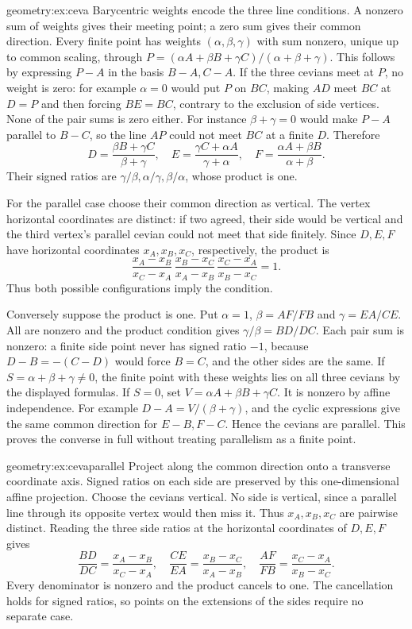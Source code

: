\begin{solution}{geometry:ex:ceva}
\idea Barycentric weights encode the three line conditions. A nonzero sum of weights gives their meeting point; a zero sum gives their common direction.
\writeup Every finite point has weights $(\alpha,\beta,\gamma)$ with sum nonzero, unique up to common scaling, through
$P=(\alpha A+\beta B+\gamma C)/(\alpha+\beta+\gamma)$. This follows by expressing $P-A$ in the basis $B-A,C-A$. If the three cevians meet at $P$, no weight is zero: for example $\alpha=0$ would put $P$ on $BC$, making $AD$ meet $BC$ at $D=P$ and then forcing $BE=BC$, contrary to the exclusion of side vertices. None of the pair sums is zero either. For instance $\beta+\gamma=0$ would make $P-A$ parallel to $B-C$, so the line $AP$ could not meet $BC$ at a finite $D$. Therefore
\[
D=\frac{\beta B+\gamma C}{\beta+\gamma},\quad
E=\frac{\gamma C+\alpha A}{\gamma+\alpha},\quad
F=\frac{\alpha A+\beta B}{\alpha+\beta}.
\]
Their signed ratios are $\gamma/\beta,\alpha/\gamma,\beta/\alpha$, whose product is one.

For the parallel case choose their common direction as vertical. The vertex horizontal coordinates are distinct: if two agreed, their side would be vertical and the third vertex's parallel cevian could not meet that side finitely. Since $D,E,F$ have horizontal coordinates $x_A,x_B,x_C$, respectively, the product is
\[
\frac{x_A-x_B}{x_C-x_A}\,
\frac{x_B-x_C}{x_A-x_B}\,
\frac{x_C-x_A}{x_B-x_C}=1.
\]
Thus both possible configurations imply the condition.

Conversely suppose the product is one. Put $\alpha=1$, $\beta=AF/FB$ and $\gamma=EA/CE$. All are nonzero and the product condition gives $\gamma/\beta=BD/DC$. Each pair sum is nonzero: a finite side point never has signed ratio $-1$, because $D-B=-(C-D)$ would force $B=C$, and the other sides are the same. If $S=\alpha+\beta+\gamma\ne0$, the finite point with these weights lies on all three cevians by the displayed formulas. If $S=0$, set $V=\alpha A+\beta B+\gamma C$. It is nonzero by affine independence. For example
$D-A=V/(\beta+\gamma)$, and the cyclic expressions give the same common direction for $E-B,F-C$. Hence the cevians are parallel. This proves the converse in full without treating parallelism as a finite point.
\end{solution}

\begin{solution}{geometry:ex:cevaparallel}
\idea Project along the common direction onto a transverse coordinate axis. Signed ratios on each side are preserved by this one-dimensional affine projection.
\writeup Choose the cevians vertical. No side is vertical, since a parallel line through its opposite vertex would then miss it. Thus $x_A,x_B,x_C$ are pairwise distinct. Reading the three side ratios at the horizontal coordinates of $D,E,F$ gives
\[
\frac{BD}{DC}=\frac{x_A-x_B}{x_C-x_A},\quad
\frac{CE}{EA}=\frac{x_B-x_C}{x_A-x_B},\quad
\frac{AF}{FB}=\frac{x_C-x_A}{x_B-x_C}.
\]
Every denominator is nonzero and the product cancels to one. The cancellation holds for signed ratios, so points on the extensions of the sides require no separate case.
\end{solution}

